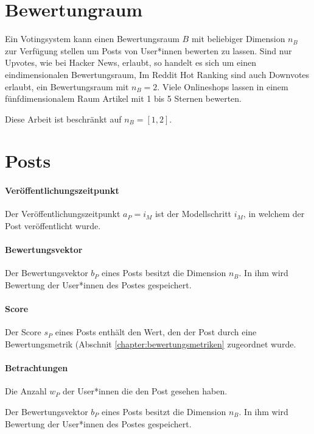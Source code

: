 \section{Bewertungraum}

Ein Votingsystem kann einen Bewertungsraum $B$ mit beliebiger Dimension $n_B$ zur Verfügung stellen um Posts von User*innen bewerten zu lassen. Sind nur Upvotes, wie bei Hacker News, erlaubt, so handelt es sich um einen eindimensionalen Bewertungsraum, Im Reddit Hot Ranking sind auch Downvotes erlaubt, ein Bewertungsraum mit $n_B = 2$. Viele Onlineshops lassen in einem fünfdimensionalem Raum Artikel mit 1 bis 5 Sternen bewerten.

Diese Arbeit ist beschränkt auf $n_B = [1,2]$. 


\section{Posts}

\paragraph{Veröffentlichungszeitpunkt}
Der Veröffentlichungszeitpunkt $a_P = i_M$ ist der Modellschritt $i_M$, in welchem der Post veröffentlicht wurde.

\paragraph{Bewertungsvektor}

Der Bewertungsvektor $b_P$ eines Posts besitzt die Dimension $n_B$. In ihm wird Bewertung der User*innen des Postes gespeichert.

\paragraph{Score}

Der Score $s_P$ eines Posts enthält den Wert, den der Post durch eine Bewertungsmetrik (Abschnit \ref{chapter:bewertungsmetriken} zugeordnet wurde.

\paragraph{Betrachtungen}

Die Anzahl $w_P$ der User*innen  die den Post gesehen haben.

Der Bewertungsvektor $b_P$ eines Posts besitzt die Dimension $n_B$. In ihm wird Bewertung der User*innen des Postes gespeichert.

